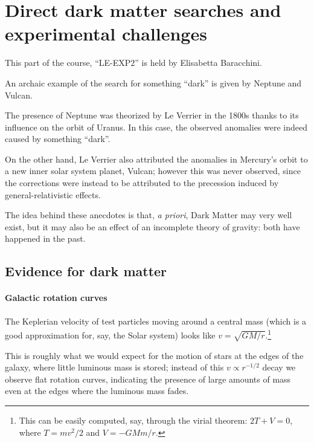 \documentclass[main.tex]{subfiles}
\begin{document}
\section{Direct dark matter searches and experimental challenges}


This part of the course, ``LE-EXP2'' is held by Elisabetta Baracchini. 

An archaic example of the search for something ``dark'' is given by 
Neptune and Vulcan. 

The presence of Neptune was theorized by Le Verrier in the 1800s 
thanks to its influence on the orbit of Uranus. 
In this case, the observed anomalies were indeed caused by something ``dark''.

On the other hand, Le Verrier also attributed the anomalies in Mercury's orbit
to a new inner solar system planet, Vulcan; however this was never observed, 
since the corrections were instead to be attributed to the precession induced by 
general-relativistic effects. 

The idea behind these anecdotes is that, \emph{a priori}, Dark Matter may very well
exist, but it may also be an effect of an incomplete theory of gravity: 
both have happened in the past. 

\subsection{Evidence for dark matter}

\paragraph{Galactic rotation curves}

The Keplerian velocity of test particles moving around a central mass 
(which is a good approximation for, say, the Solar system)
looks like \(v=  \sqrt{GM / r}\).\footnote{This can be easily computed, 
say, through the virial theorem: \(2T  +V = 0\), where \(T = mv^2 / 2\) 
and \(V = - GMm/r\).}

This is roughly what we would expect for the motion of stars at the edges 
of the galaxy, where little luminous mass is stored; instead of this \(v \propto r^{-1/2}\) 
decay we observe flat rotation curves, indicating the presence of large amounts of mass
even at the edges where the luminous mass fades. 
\end{document}
